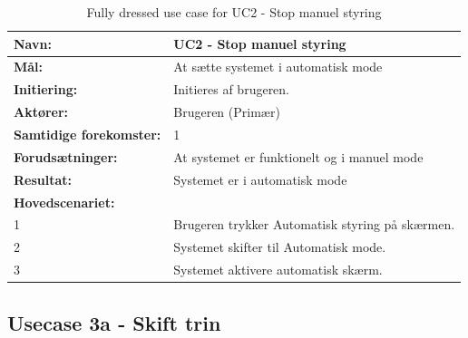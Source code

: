 \begin{table}[H]
	\centering
	
	\begin{threeparttable}
		\begin{tabularx}{\linewidth}{ l X }
			\toprule
			\bfseries{Navn:}				& UC2 - Stop manuel styring  \\
			\midrule
			\bfseries{Mål:} 				& At sætte systemet i automatisk mode \\
			\midrule
			\bfseries{Initiering:} 			& Initieres af brugeren. \\
			\midrule
			\bfseries{Aktører:} 			& Brugeren (Primær) \\
			\midrule
			\bfseries{Samtidige forekomster:} & 1 \\
			\midrule
			\bfseries{Forudsætninger:} 		& At systemet er funktionelt og i manuel mode\\
			\midrule
			\bfseries{Resultat:} 			& Systemet er i automatisk mode \\
			\midrule
			\bfseries{Hovedscenariet:} 	& \\
			
			
			1 	& Brugeren trykker Automatisk styring på skærmen.\\
			2 	& Systemet skifter til Automatisk mode.\\
			3 	& Systemet aktivere automatisk skærm. 	\\		
				
			
			\bottomrule
			
		\end{tabularx}
	\end{threeparttable}
	\caption{Fully dressed use case for UC2 - Stop manuel styring}
	\label{table:UC2}
\end{table}

\subsection{Usecase 3a - Skift trin}

